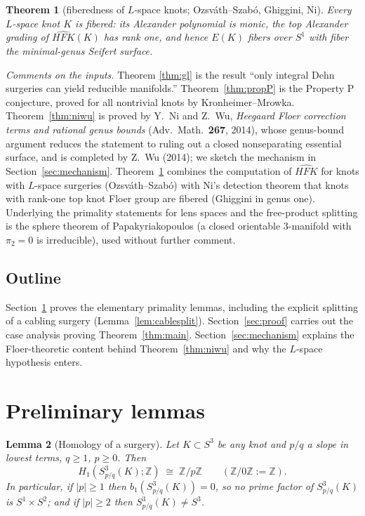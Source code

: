 \documentclass[11pt]{article}
\newtheorem{theorem}{Theorem}[section]
\newtheorem{lemma}[theorem]{Lemma}
\theoremstyle{definition}
\theoremstyle{remark}
\newcommand{\HFK}{\widehat{HFK}}
\newcommand{\Z}{\mathbb{Z}}
\begin{document}
\begin{theorem}[fiberedness of $L$-space knots; Ozsv\'ath--Szab\'o, Ghiggini,
Ni]\label{thm:fibered}
Every $L$-space knot $K$ is fibered: its Alexander polynomial is monic, the
top Alexander grading of $\HFK(K)$ has rank one, and hence
$E(K)$ fibers over $S^1$ with fiber the minimal-genus Seifert surface.
\end{theorem}

\noindent\emph{Comments on the inputs.}  Theorem \ref{thm:gl} is the result
``only integral Dehn surgeries can yield reducible manifolds.''
Theorem~\ref{thm:propP} is the Property P conjecture, proved for all
nontrivial knots by Kronheimer--Mrowka.  Theorem~\ref{thm:niwu} is proved by
Y.~Ni and Z.~Wu, \emph{Heegaard Floer correction terms and rational genus
bounds} (Adv.~Math.~\textbf{267}, 2014), whose genus-bound argument reduces
the statement to ruling out a closed nonseparating essential surface, and is
completed by Z.~Wu (2014); we sketch the mechanism in
Section~\ref{sec:mechanism}.  Theorem~\ref{thm:fibered} combines the
computation of $\HFK$ for knots with $L$-space surgeries
(Ozsv\'ath--Szab\'o) with Ni's detection theorem that knots with rank-one top
knot Floer group are fibered (Ghiggini in genus one).
Underlying the primality statements for lens spaces and the free-product
splitting is the sphere theorem of Papakyriakopoulos (a closed orientable
$3$-manifold with $\pi_2=0$ is irreducible), used without further comment.

\subsection{Outline}

Section~\ref{sec:prelim} proves the elementary primality lemmas, including the
explicit splitting of a cabling surgery (Lemma~\ref{lem:cablesplit}).
Section~\ref{sec:proof} carries out the case analysis proving
Theorem~\ref{thm:main}.  Section~\ref{sec:mechanism} explains the Floer-theoretic
content behind Theorem~\ref{thm:niwu} and why the $L$-space hypothesis enters.

\section{Preliminary lemmas}\label{sec:prelim}

\begin{lemma}[Homology of a surgery]\label{lem:homology}
Let $K\subset S^3$ be any knot and $p/q$ a slope in lowest terms, $q\ge 1$,
$p\ge 0$.  Then
\[
H_1(S^3_{p/q}(K);\Z)\;\cong\;\Z/p\Z
\qquad(\Z/0\Z:=\Z).
\]
In particular, if $|p|\ge 1$ then $b_1(S^3_{p/q}(K))=0$, so no prime factor
of $S^3_{p/q}(K)$ is $S^1\times S^2$; and if $|p|\ge 2$ then
$S^3_{p/q}(K)\neq S^3$.
\end{lemma}
\end{document}
